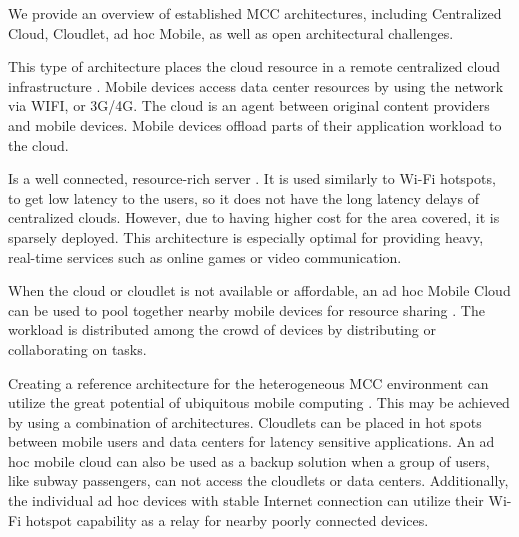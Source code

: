 We provide an overview of established MCC architectures, including Centralized Cloud, Cloudlet, ad hoc Mobile, as well as open architectural challenges.
\begin{description}[style=nextline]
\item [Centralized Cloud]
This type of architecture places the cloud resource in a remote centralized cloud infrastructure \citep{liu2013gearing}. Mobile devices access data center resources by using the network via WIFI, or 3G/4G. The cloud is an agent between original content providers and mobile devices. Mobile devices offload parts of their application workload to the cloud.
\item [Cloudlet]
Is a well connected, resource-rich server \citep{liu2013gearing}. 
It is used similarly to Wi-Fi hotspots, to get low latency to the users, so it does not have the long latency delays of centralized clouds. 
However, due to having higher cost for the area covered, it is sparsely deployed. 
This architecture is especially optimal for providing heavy, real-time services such as online games or video communication.
\item [ad hoc Mobile Cloud]
When the cloud or cloudlet is not available or affordable, an ad hoc Mobile Cloud can be used to pool together nearby mobile devices for resource sharing \citep[p.4]{liu2013gearing}. 
The workload is distributed among the crowd of devices by distributing or collaborating on tasks.
\item [Architectural Challenges]
Creating a reference architecture for the heterogeneous MCC environment can utilize the great potential of ubiquitous mobile computing \citep{sanaei2014heterogeneity}. 
This may be achieved by using a combination of architectures. 
Cloudlets can be placed in hot spots between mobile users and data centers for latency sensitive applications. 
An ad hoc mobile cloud can also be used as a backup solution when a group of users, like subway passengers, can not access the cloudlets or data centers. 
Additionally, the individual ad hoc devices with stable Internet connection can utilize their Wi-Fi hotspot capability as a relay for nearby poorly connected devices.


\end{description}